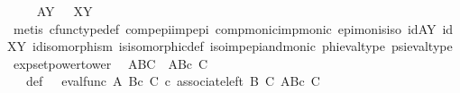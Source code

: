 \begin{isabellebody}
\ \ \isamarkupfalse%
\ \ {\isachardoublequoteopen}A\isactrlbsup Y\isactrlesup \ {\isasymcong}\ \ X\isactrlbsup Y\isactrlesup {\isachardoublequoteclose}\isanewline
\ \ \ \ \isamarkupfalse%
\ {\isacharparenleft}{\kern0pt}metis\ cfunc{\isacharunderscore}{\kern0pt}type{\isacharunderscore}{\kern0pt}def\ comp{\isacharunderscore}{\kern0pt}epi{\isacharunderscore}{\kern0pt}imp{\isacharunderscore}{\kern0pt}epi\ comp{\isacharunderscore}{\kern0pt}monic{\isacharunderscore}{\kern0pt}imp{\isacharunderscore}{\kern0pt}monic\ epi{\isacharunderscore}{\kern0pt}mon{\isacharunderscore}{\kern0pt}is{\isacharunderscore}{\kern0pt}iso\ idAY\ idXY\ id{\isacharunderscore}{\kern0pt}isomorphism\ is{\isacharunderscore}{\kern0pt}isomorphic{\isacharunderscore}{\kern0pt}def\ iso{\isacharunderscore}{\kern0pt}imp{\isacharunderscore}{\kern0pt}epi{\isacharunderscore}{\kern0pt}and{\isacharunderscore}{\kern0pt}monic\ phi{\isacharunderscore}{\kern0pt}eval{\isacharunderscore}{\kern0pt}type\ psi{\isacharunderscore}{\kern0pt}eval{\isacharunderscore}{\kern0pt}type{\isacharparenright}{\kern0pt}\isanewline
{}\isamarkupfalse%
%
\endisatagproof
{\isafoldproof}%
%
\isadelimproof
\isanewline
%
\endisadelimproof
\isanewline
{}\isamarkupfalse%
\ expset{\isacharunderscore}{\kern0pt}power{\isacharunderscore}{\kern0pt}tower{\isacharcolon}{\kern0pt}\isanewline
\ \ {\isachardoublequoteopen}{\isacharparenleft}{\kern0pt}A\isactrlbsup B\isactrlesup {\isacharparenright}{\kern0pt}\isactrlbsup C\isactrlesup \ {\isasymcong}\ A\isactrlbsup {\isacharparenleft}{\kern0pt}B{\isasymtimes}\isactrlsub c\ C{\isacharparenright}{\kern0pt}\isactrlesup {\isachardoublequoteclose}\isanewline
%
\isadelimproof
%
\endisadelimproof
%
\isatagproof
{}\isamarkupfalse%
\ {\isacharminus}{\kern0pt}\ \isanewline
\ \ \isamarkupfalse%
\ {\isasymphi}\ \ {\isasymphi}{\isacharunderscore}{\kern0pt}def{\isacharcolon}{\kern0pt}\ {\isachardoublequoteopen}{\isasymphi}\ {\isacharequal}{\kern0pt}\ {\isacharparenleft}{\kern0pt}{\isacharparenleft}{\kern0pt}eval{\isacharunderscore}{\kern0pt}func\ A\ {\isacharparenleft}{\kern0pt}B{\isasymtimes}\isactrlsub c\ C{\isacharparenright}{\kern0pt}{\isacharparenright}{\kern0pt}\ {\isasymcirc}\isactrlsub c\ {\isacharparenleft}{\kern0pt}associate{\isacharunderscore}{\kern0pt}left\ B\ C\ {\isacharparenleft}{\kern0pt}A\isactrlbsup {\isacharparenleft}{\kern0pt}B{\isasymtimes}\isactrlsub c\ C{\isacharparenright}{\kern0pt}\isactrlesup {\isacharparenright}{\kern0pt}{\isacharparenright}{\kern0pt}{\isacharparenright}{\kern0pt}{\isachardoublequoteclose}\ \isanewline

\end{isabellebody}
